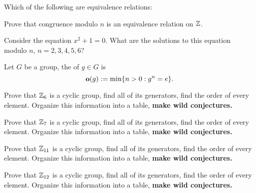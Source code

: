 \documentclass{ximera}
\begin{document}
\begin{exercise}
  Which of the following are equivalence relations:
  \begin{selectAll}
  \end{selectAll}
\end{exercise}


\begin{exercise}
  Prove that congruence modulo $n$ is an equivalence relation on $\mathbb Z$.
\end{exercise}


\begin{exercise}
  Consider the equation $x^2+1 = 0$. What are the solutions to this
  equation modulo $n$, $n=2,3,4,5,6$?
\end{exercise}


\begin{definition}
  Let $G$ be a group, the  of $g\in G$ is
  \[
  \mathbf o(g) := \min\{n>0: g^n = e\}.
  \]
\end{definition}


\begin{exercise}
  Prove that $\mathbb Z_{6}$ is a cyclic group, find all of its generators,
  find the order of every element. Organize this information into a
  table, \textbf{make wild conjectures.}
\end{exercise}

\begin{exercise}
  Prove that $\mathbb Z_{7}$ is a cyclic group, find all of its generators,
  find the order of every element. Organize this information into a
  table, \textbf{make wild conjectures.}
\end{exercise}


\begin{exercise}
  Prove that $\mathbb Z_{11}$ is a cyclic group, find all of its generators,
  find the order of every element. Organize this information into a
  table, \textbf{make wild conjectures.}
\end{exercise}



\begin{exercise}
  Prove that $\mathbb Z_{12}$ is a cyclic group, find all of its generators,
  find the order of every element. Organize this information into a
  table, \textbf{make wild conjectures.}
\end{exercise}
\end{document}
